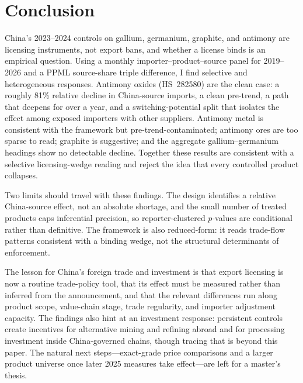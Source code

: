 \documentclass[12pt,a4paper]{article}
\begin{document}
\section{Conclusion}\label{sec:conclusion}

China's 2023--2024 controls on gallium, germanium, graphite, and antimony are
licensing instruments, not export bans, and whether a license binds is an
empirical question. Using a monthly importer--product--source panel for
2019--2026 and a PPML source-share triple difference, I find selective and
heterogeneous responses. Antimony oxides (HS~282580) are the clean case: a
roughly 81\% relative decline in China-source imports, a clean pre-trend, a path
that deepens for over a year, and a switching-potential split that isolates the
effect among exposed importers with other suppliers. Antimony metal is
consistent with the framework but pre-trend-contaminated; antimony ores are too
sparse to read; graphite is suggestive; and the aggregate gallium--germanium
headings show no detectable decline. Together these results are consistent with
a selective licensing-wedge reading and reject the idea that every controlled
product collapses.

Two limits should travel with these findings. The design identifies a relative
China-source effect, not an absolute shortage, and the small number of treated
products caps inferential precision, so reporter-clustered $p$-values are
conditional rather than definitive. The framework is also reduced-form: it reads
trade-flow patterns consistent with a binding wedge, not the structural
determinants of enforcement.

The lesson for China's foreign trade and investment is that export licensing is
now a routine trade-policy tool, that its effect must be measured rather than
inferred from the announcement, and that the relevant differences run along
product scope, value-chain stage, trade regularity, and importer adjustment
capacity. The findings also hint at an investment response: persistent controls
create incentives for alternative mining and refining abroad and for processing
investment inside China-governed chains, though tracing that is beyond this
paper. The natural next steps---exact-grade price comparisons and a larger
product universe once later 2025 measures take effect---are left for a master's
thesis.

\renewcommand{\refname}{References}


\end{document}
